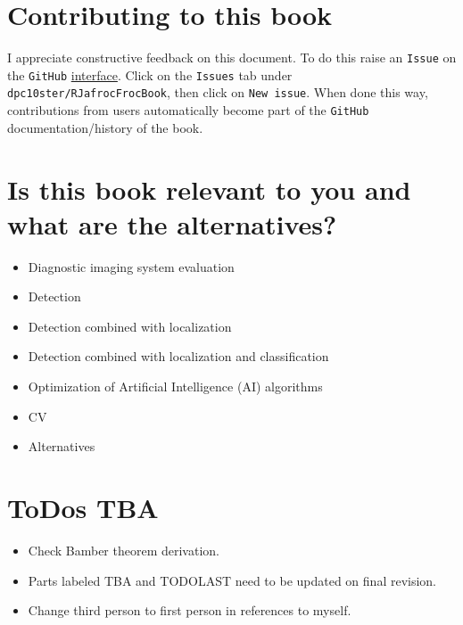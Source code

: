 \documentclass[
]{book}
\providecommand{\tightlist}{%
  \setlength{\itemsep}{0pt}\setlength{\parskip}{0pt}}
\begin{document}
\hypertarget{contributing-to-this-book}{%
\section*{Contributing to this book}\label{contributing-to-this-book}}

I appreciate constructive feedback on this document. To do this raise an \texttt{Issue} on the \texttt{GitHub} \href{https://github.com/dpc10ster/RJafrocFrocBook}{interface}. Click on the \texttt{Issues} tab under \texttt{dpc10ster/RJafrocFrocBook}, then click on \texttt{New\ issue}. When done this way, contributions from users automatically become part of the \texttt{GitHub} documentation/history of the book.

\hypertarget{is-this-book-relevant-to-you-and-what-are-the-alternatives}{%
\section*{Is this book relevant to you and what are the alternatives?}\label{is-this-book-relevant-to-you-and-what-are-the-alternatives}}

\begin{itemize}
\tightlist
\item
  Diagnostic imaging system evaluation
\item
  Detection
\item
  Detection combined with localization
\item
  Detection combined with localization and classification
\item
  Optimization of Artificial Intelligence (AI) algorithms
\item
  CV
\item
  Alternatives
\end{itemize}

\hypertarget{todos-tba}{%
\section*{ToDos TBA}\label{todos-tba}}

\begin{itemize}
\tightlist
\item
  Check Bamber theorem derivation.
\item
  Parts labeled TBA and TODOLAST need to be updated on final revision.
\item
  Change third person to first person in references to myself.
\end{itemize}
\end{document}
